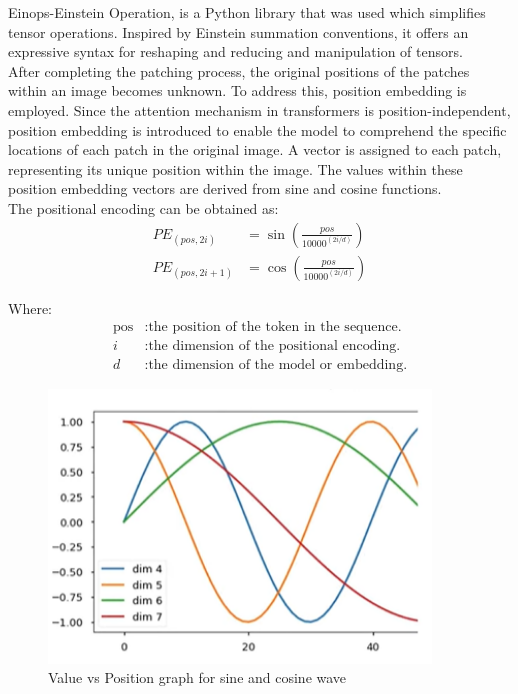 Einops-Einstein Operation, is a Python library that was used which simplifies tensor operations. Inspired by Einstein summation conventions, it offers an expressive syntax for reshaping and reducing and manipulation of tensors. \\

After completing the patching process, the original positions of the patches within an image becomes unknown. To address this, position embedding is employed. Since the attention mechanism in transformers is position-independent, position embedding is introduced to enable the model to comprehend the specific locations of each patch in the original image. A vector is assigned to each patch, representing its unique position within the image. The values within these position embedding vectors are derived from sine and cosine functions.\\

The positional encoding can be obtained as:\\
\begin{align}
    PE_{(pos, 2i)}   & = \sin\left(\frac{pos}{{10000}^{(2i/d)}}\right) \label{eq:pos_encoding_sin} \\
    PE_{(pos, 2i+1)} & = \cos\left(\frac{pos}{{10000}^{(2i/d)}}\right) \label{eq:pos_encoding_cos}
\end{align}

Where:
\begin{align*}
    \text{pos} & : \text{the position of the token in the sequence.} \\
    i          & : \text{the dimension of the positional encoding.}  \\
    d          & : \text{the dimension of the model or embedding.}
\end{align*}

\begin{figure}[htbp]
    \centering
    \includegraphics[width=4in]{img/plot for sine and cosine wave.png}
    \caption{{Value vs Position graph for sine and cosine wave}}
\end{figure}

